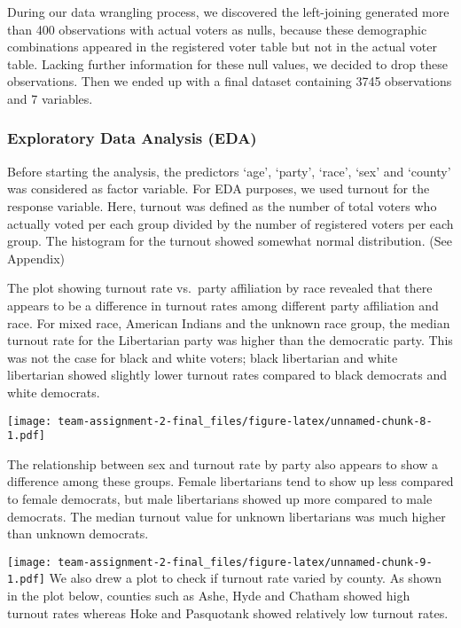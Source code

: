 \documentclass[
]{article}
\begin{document}
During our data wrangling process, we discovered the left-joining
generated more than 400 observations with actual voters as nulls,
because these demographic combinations appeared in the registered voter
table but not in the actual voter table. Lacking further information for
these null values, we decided to drop these observations. Then we ended
up with a final dataset containing 3745 observations and 7 variables.

\hypertarget{exploratory-data-analysis-eda-1}{%
\subsubsection{Exploratory Data Analysis
(EDA)}\label{exploratory-data-analysis-eda-1}}

Before starting the analysis, the predictors `age', `party', `race',
`sex' and `county' was considered as factor variable. For EDA purposes,
we used turnout for the response variable. Here, turnout was defined as
the number of total voters who actually voted per each group divided by
the number of registered voters per each group. The histogram for the
turnout showed somewhat normal distribution. (See Appendix)

The plot showing turnout rate vs.~party affiliation by race revealed
that there appears to be a difference in turnout rates among different
party affiliation and race. For mixed race, American Indians and the
unknown race group, the median turnout rate for the Libertarian party
was higher than the democratic party. This was not the case for black
and white voters; black libertarian and white libertarian showed
slightly lower turnout rates compared to black democrats and white
democrats.

\texttt{[image: team-assignment-2-final\_files/figure-latex/unnamed-chunk-8-1.pdf]}

The relationship between sex and turnout rate by party also appears to
show a difference among these groups. Female libertarians tend to show
up less compared to female democrats, but male libertarians showed up
more compared to male democrats. The median turnout value for unknown
libertarians was much higher than unknown democrats.

\texttt{[image: team-assignment-2-final\_files/figure-latex/unnamed-chunk-9-1.pdf]}
We also drew a plot to check if turnout rate varied by county. As shown
in the plot below, counties such as Ashe, Hyde and Chatham showed high
turnout rates whereas Hoke and Pasquotank showed relatively low turnout
rates.
\end{document}
